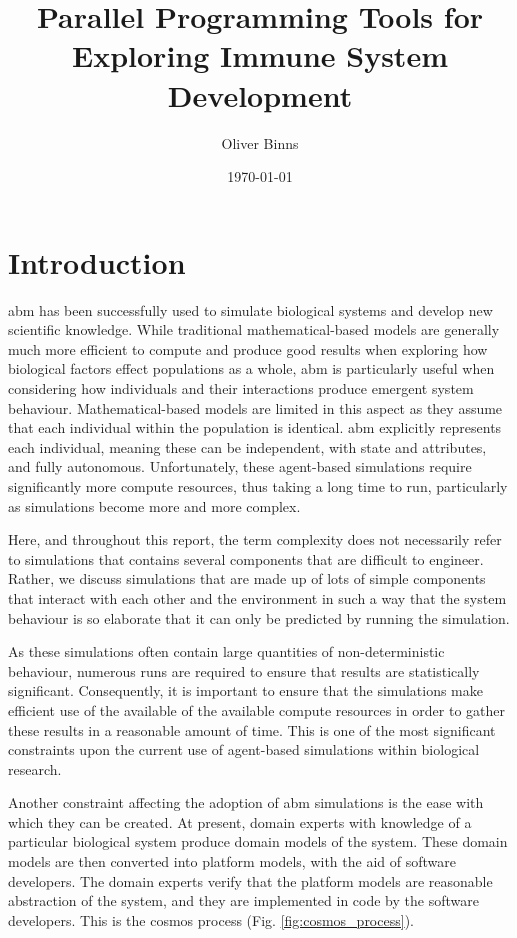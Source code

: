 \documentclass{UoYCSproject}
\title{Parallel Programming Tools for Exploring Immune System Development}
\author{Oliver Binns}
\date{\today}
\begin{document}
\maketitle
\listoffigures
\listoftables
\printglossary[type=\acronymtype]
\printglossary


\chapter{Introduction}
\gls{abm} has been successfully used to simulate biological systems and develop new scientific knowledge\cite{kieran_thesis, flame_keratinocyte}.
While traditional mathematical-based models are generally much more efficient to compute and produce good results when exploring how biological factors effect populations as a whole, \gls{abm} is particularly useful when considering how individuals and their interactions produce emergent system behaviour.
Mathematical-based models are limited in this aspect as they assume that each individual within the population is identical.
\gls{abm} explicitly represents each individual, meaning these can be independent, with state and attributes, and fully autonomous.
Unfortunately, these agent-based simulations require significantly more compute resources, thus taking a long time to run, particularly as simulations become more and more complex.

Here, and throughout this report, the term complexity does not necessarily refer to simulations that contains several components that are difficult to engineer.
Rather, we discuss simulations that are made up of lots of simple components that interact with each other and the environment in such a way that the system behaviour is so elaborate that it can only be predicted by running the simulation.

As these simulations often contain large quantities of non-deterministic behaviour, numerous runs are required to ensure that results are statistically significant.
Consequently, it is important to ensure that the simulations make efficient use of the available of the available compute resources in order to gather these results in a reasonable amount of time.
This is one of the most significant constraints upon the current use of agent-based simulations within biological research.

Another constraint affecting the adoption of \gls{abm} simulations is the ease with which they can be created.
At present, domain experts with knowledge of a particular biological system produce domain models of the system.
These domain models are then converted into platform models, with the aid of software developers.
The domain experts verify that the platform models are reasonable abstraction of the system, and they are implemented in code by the software developers.
This is the \gls{cosmos} process (Fig. \ref{fig:cosmos_process}).
\end{document}
